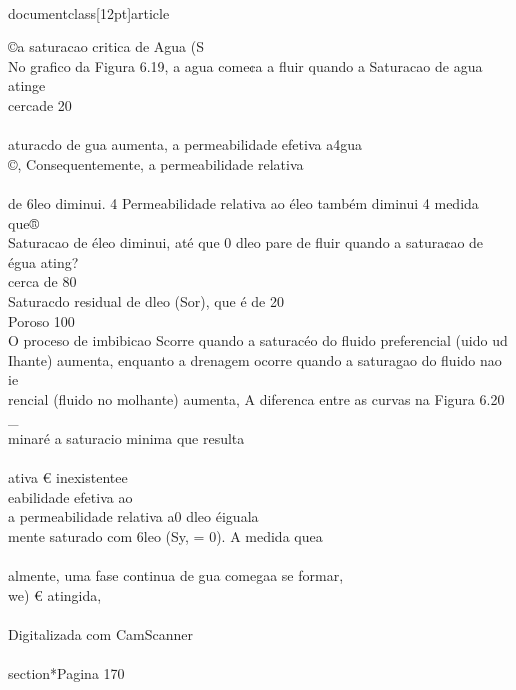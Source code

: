 \\documentclass[12pt]{article}
\begin{document}
©a saturacao critica de Agua (S\\
No grafico da Figura 6.19, a agua come¢a a fluir quando a Saturacao de agua atinge\\
cercade 20\\%
\\
aturacdo de gua aumenta, a permeabilidade efetiva a4gua\\
©, Consequentemente, a permeabilidade relativa\\
\\
de 6leo diminui. 4 Permeabilidade relativa ao éleo também diminui 4 medida que®\\
Saturacao de éleo diminui, até que 0 dleo pare de fluir quando a satura¢ao de égua ating?\\
cerca de 80\\%
Saturacdo residual de dleo (Sor), que é de 20\\%
Poroso 100\\%
O proceso de imbibicao Scorre quando a saturacéo do fluido preferencial (uido ud\\
Ihante) aumenta, enquanto a drenagem ocorre quando a saturagao do fluido nao ie\\
rencial (fluido no molhante) aumenta, A diferenca entre as curvas na Figura 6.20 \\_\\
minaré a saturacio minima que resulta\\
\\
ativa € inexistentee\\
eabilidade efetiva ao\\
a permeabilidade relativa a0 dleo éiguala\\
mente saturado com 6leo (Sy, = 0). A medida quea\\
\\
almente, uma fase continua de gua comegaa se formar,\\
we) € atingida,\\
\\
Digitalizada com CamScanner\\

\\section*{Pagina 170}
\end{document}
